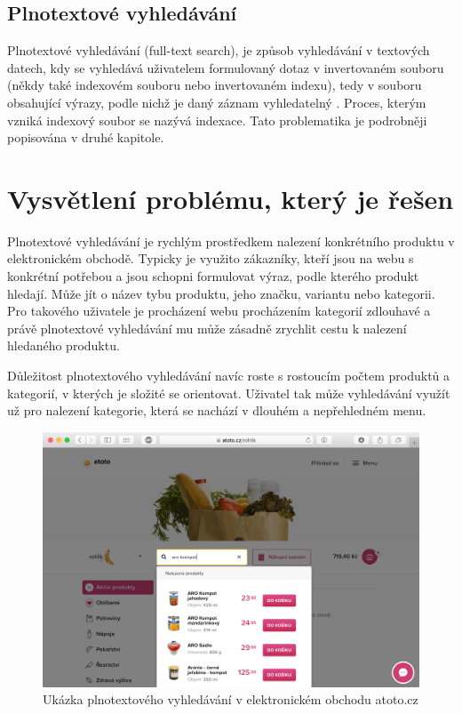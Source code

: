 \documentclass[FM,DP]{tulthesis}
\begin{document}
\subsection*{Plnotextové vyhledávání}

Plnotextové vyhledávání (full-text search), je způsob vyhledávání v textových datech, 
kdy se vyhledává uživatelem formulovaný dotaz v invertovaném souboru (někdy také 
indexovém souboru nebo invertovaném indexu), tedy v souboru obsahující výrazy, 
podle nichž je daný záznam vyhledatelný \cite[strana~15]{strossa}. 
Proces, kterým vzniká indexový soubor se nazývá indexace. Tato problematika je podrobněji
popisována v druhé kapitole.

\section{Vysvětlení problému, který je řešen}

Plnotextové vyhledávání je rychlým prostředkem nalezení konkrétního produktu
v elektronickém obchodě. Typicky je využito zákazníky, kteří jsou na webu
s konkrétní potřebou a jsou schopni formulovat výraz, podle kterého produkt
hledají. Může jít o název tybu produktu, jeho značku, variantu nebo kategorii.
Pro takového uživatele je procházení webu procházením kategorií zdlouhavé
a právě plnotextové vyhledávání mu může zásadně zrychlit cestu k nalezení 
hledaného produktu.

Důležitost plnotextového vyhledávání navíc roste s rostoucím počtem produktů a kategorií, 
v kterých je složité se orientovat. Uživatel tak může vyhledávání využít už pro 
nalezení kategorie, která se nachází v dlouhém a nepřehledném menu.

\begin{figure}[h]
\center
\includegraphics[width=\textwidth]{atoto-vyhledavani.png}
\caption[Ukázka plnotextového vyhledávání]{Ukázka plnotextového vyhledávání v elektronickém obchodu atoto.cz}
\label{atoto-vyhledavani}
\end{figure}
\end{document}
